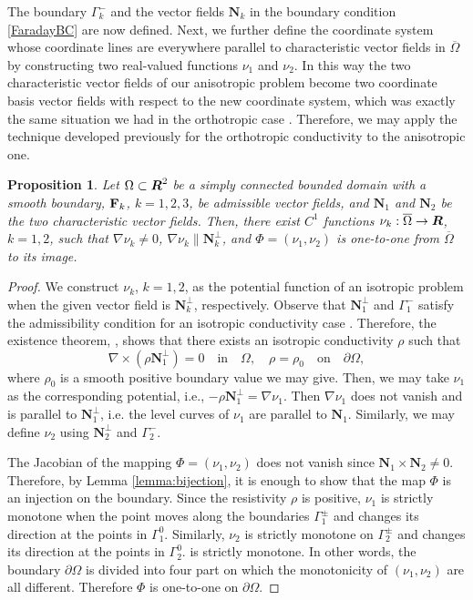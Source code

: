 \documentclass[11pt]{amsart}
\theoremstyle{plain}
\newtheorem{Prop}[Thm]{Proposition}
\numberwithin{equation}{section}
\numberwithin{Thm}{section}
\def\R{\mbox{\boldmath$R$}}
\def\N{{\mathbf N}}
\def\F{{\bf F}}
\begin{document}
The boundary $\Gamma_k^-$ and the vector fields $\N_k$ in the boundary condition \eqref{FaradayBC} are now defined. Next, we further define the coordinate system whose coordinate lines are everywhere parallel to characteristic vector fields in $\overline\Omega$ by constructing two real-valued functions $\nu_1$ and $\nu_2$. In this way the two characteristic vector fields of our anisotropic problem become two coordinate basis vector fields with respect to the new coordinate system, which was exactly the same situation we had in the orthotropic case \cite{lee_orthotropic_2015}. Therefore, we may apply the technique developed previously for the orthotropic conductivity to the anisotropic one.

\begin{Prop} \label{lemma:charcoord}
Let $\Omega\subset\R^2$  be a simply connected bounded domain with a smooth boundary, $\F_k$, $k=1,2,3$, be admissible vector fields, and $\N_1$ and $\N_2$ be the two characteristic vector fields. Then, there exist $C^1$ functions $\nu_k:\overline\Omega\to\R$, $k=1,2$, such that $\nabla \nu_k\ne0$, $\nabla\nu_k\parallel\N_k^\perp$, and $\Phi =(\nu_1,\nu_2)$ is one-to-one from $\overline\Omega$ to its image.
\end{Prop}
\begin{proof}
We construct $\nu_k$, $k=1,2$, as the potential function of an isotropic problem when the given vector field is $\N_k^\perp$, respectively. Observe that $\N_1^\perp$ and $\Gamma^-_1$ satisfy the admissibility condition for an isotropic conductivity case \cite[Definition 2.1]{lee_well-posedness_2015}. Therefore, the existence theorem, \cite[Theorem 1]{lee_well-posedness_2015}, shows that
there exists an isotropic conductivity $\rho$ such that
$$
\nabla \times (\rho\N_1^\perp) = 0\quad\mbox{in}\quad\Omega, \quad \rho=\rho_0\quad\mbox{on}\quad\partial\Omega,
$$
where $\rho_0$ is a smooth positive boundary value we may give. Then, we may take $\nu_1$ as the corresponding potential, i.e., $-\rho\N_1^\perp = \nabla \nu_1$. Then $\nabla\nu_1$ does not vanish and is parallel to $\N_1^\perp$, i.e. the level curves of $\nu_1$ are parallel to $\N_1$. Similarly, we may define $\nu_2$ using $\N_2^\perp$ and $\Gamma^-_2$.

The Jacobian of the mapping $\Phi =(\nu_1,\nu_2)$ does not vanish since $\N_1\times\N_2\ne 0$. Therefore, by Lemma \ref{lemma:bijection}, it is enough to show that the map $\Phi$ is an injection on the boundary. Since the resistivity $\rho$ is positive, $\nu_1$ is strictly monotone when the point moves along the boundaries $\Gamma_1^\pm$ and changes its direction at the points in $\Gamma_1^0$. Similarly, $\nu_2$ is strictly monotone on $\Gamma_2^\pm$ and changes its direction at the points in $\Gamma_2^0$. is strictly monotone. In other words, the boundary $\partial\Omega$ is divided into four part on which the monotonicity of $(\nu_1,\nu_2)$ are all different. Therefore $\Phi$ is one-to-one on $\partial\Omega$.
\end{proof}
\end{document}
